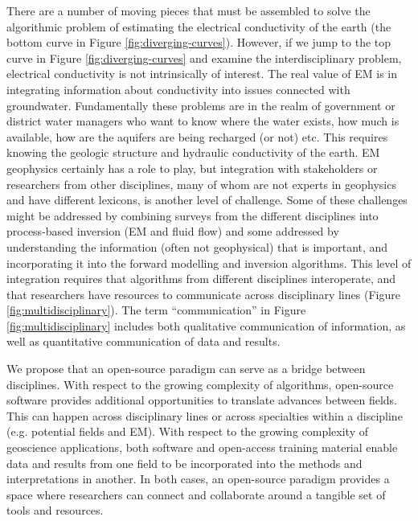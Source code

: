 \documentclass[paper]{geophysics}
\begin{document}
There are a number of moving pieces that must be assembled to solve the algorithmic problem of estimating the electrical conductivity of the earth (the bottom curve in Figure \ref{fig:diverging-curves}). However, if we jump to the top curve in Figure \ref{fig:diverging-curves} and examine the interdisciplinary problem, electrical conductivity is not intrinsically of interest. The real value of EM is in integrating information about conductivity into issues connected with groundwater. Fundamentally these problems are in the realm of government or district water managers who want to know where the water exists, how much is available, how are the aquifers are being recharged (or not) etc. This requires knowing the geologic structure and hydraulic conductivity of the earth. EM geophysics certainly has a role to play, but integration with stakeholders or researchers from other disciplines, many of whom are not experts in geophysics and have different lexicons, is another level of challenge. Some of these challenges might be addressed by combining surveys from the different disciplines into process-based inversion (EM and fluid flow) and some addressed by understanding the information (often not geophysical) that is important, and incorporating it into the forward modelling and inversion algorithms. This level of integration requires that algorithms from different disciplines interoperate, and that researchers have resources to communicate across disciplinary lines (Figure \ref{fig:multidisciplinary}). The term “communication” in Figure \ref{fig:multidisciplinary} includes both qualitative communication of information, as well as quantitative communication of data and results.

We propose that an open-source paradigm can serve as a bridge between disciplines. With respect to the growing complexity of algorithms, open-source software provides additional opportunities to translate advances between fields. This can happen across disciplinary lines or across specialties within a discipline (e.g. potential fields and EM). With respect to the growing complexity of geoscience applications, both software and open-access training material enable data and results from one field to be incorporated into the methods and interpretations in another. In both cases, an open-source paradigm provides a space where researchers can connect and collaborate around a tangible set of tools and resources.


\end{document}
